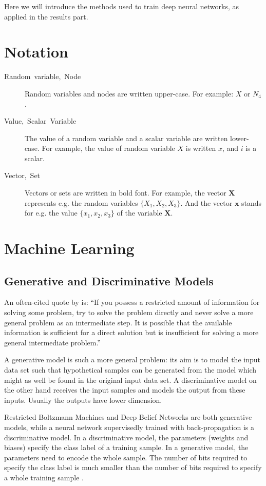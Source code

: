 Here we will introduce the methods used to train deep neural networks,
as applied in the results part.

\section{Notation}
\begin{description}
\item [{Random~variable,~Node}] Random variables and nodes are written
upper-case. For example: $X$ or $N_{4}$.
\item [{Value,~Scalar~Variable}] The value of a random variable and a
scalar variable are written lower-case. For example, the value of
random variable $X$ is written $x$, and $i$ is a scalar.
\item [{Vector,~Set}] Vectors or sets are written in bold font. For example,
the vector $\mathbf{X}$ represents e.g. the random variables $\{X_{1},X_{2},X_{3}\}$.
And the vector $\mathbf{x}$ stands for e.g. the value $\{x_{1},x_{2},x_{3}\}$
of the variable $\mathbf{X}$.
\end{description}

\section{Machine Learning}


\subsection{Generative and Discriminative Models}

An often-cited quote by \cite{Vapnik1998} is: ``If you possess a
restricted amount of information for solving some problem, try to
solve the problem directly and never solve a more general problem
as an intermediate step. It is possible that the available information
is sufficient for a direct solution but is insufficient for solving
a more general intermediate problem.''

A generative model is such a more general
problem: its aim is to model the input data set such that hypothetical
samples can be generated from the model which might as well be found
in the original input data set. A discriminative model
on the other hand receives the input samples and models the output
from these inputs. Usually the outputs have lower dimension.

Restricted Boltzmann Machines and Deep Belief Networks are both generative
models, while a neural network supervisedly trained with back-propagation
is a discriminative model. In a discriminative model, the parameters
(weights and biases) specify the class label of a training sample.
In a generative model, the parameters need to encode the whole sample.
The number of bits required to specify the class label is much smaller
than the number of bits required to specify a whole training sample
\cite{Hinton2010}.

